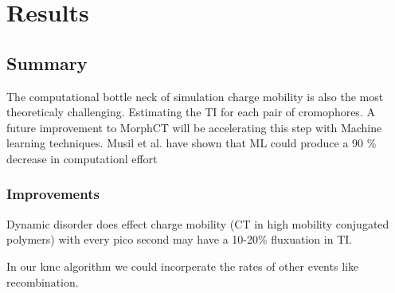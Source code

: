 \chapter{Results}
\label{chap:results}

\section{Summary}

\indent The computational bottle neck of simulation charge mobility is also the most theoreticaly challenging.
Estimating the TI for each pair of cromophores. A future improvement to MorphCT will be accelerating this step
with Machine learning techniques. Musil et al. have shown that ML could produce a 90 \% decrease in
computationl effort \cite{Musil2018}
\subsection{Improvements}
Dynamic disorder does effect charge mobility (CT in high mobility conjugated polymers) with every pico second
may have a 10-20\% fluxuation in TI. 

In our kmc algorithm we could incorperate the rates of other events like recombination. 
